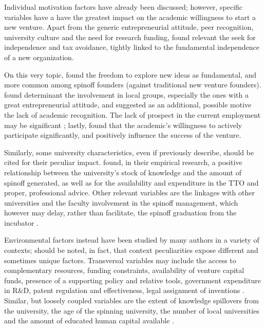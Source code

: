Individual motivation factors have already been discussed; however, specific variables have a have the greatest impact on the academic willingness to start a new venture. Apart from the generic entrepreneurial attitude, peer recognition, university culture and the need for research funding, \citet{Rizzo2015} found relevant the seek for independence and tax avoidance, tightly linked to the fundamental independence of a new organization. 

On this very topic, \citet{Perez2003} found the freedom to explore new ideas as fundamental, and more common among spinoff founders (against traditional new venture founders). \citet{Siegel2007} found determinant the involvement in local groups, especially the ones with a great entrepreneurial attitude, and suggested as an additional, possible motive the lack of academic recognition. The lack of prospect in the current employment may be significant \citep{Rizzo2015}; lastly, \citet{Ittelson2002} found that the academic's willingness to actively participate significantly, and positively influence the success of the venture.

Similarly,  some university characteristics, even if previously describe, should be cited for their peculiar impact. \citet{Lockett2005a} found, in their empirical research, a positive relationship between the university's stock of knowledge and the amount of spinoff generated, as well as for the availability and expenditure in the TTO and proper, professional advice. Other relevant variables are the linkages with other universities and the faculty involvement in the spinoff management, which however may delay, rather than facilitate, the spinoff graduation from the incubator \citep{Rothaermel2005}.

Environmental factors instead have been studied by many authors in a variety of contexts; should be noted, in fact, that context peculiarities expose different and sometimes unique factors. Transversal variables may include the access to complementary resources, funding constraints, availability of venture capital funds, presence of a supporting policy and relative tools, government expenditure in R\&D, patent regulation and effectiveness, legal assignment of inventions \citep{OShea2004, Fini2009, Rizzo2015}. Similar, but loosely coupled variables are the extent of knowledge spillovers from the university, the age of the spinning university, the number of local universities and the amount of educated human capital available \citep{Audretsch2005}.

